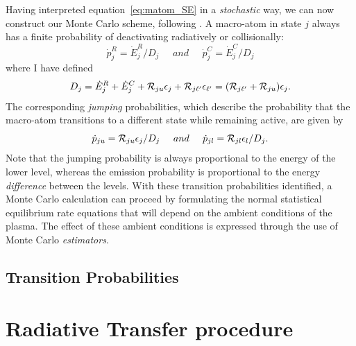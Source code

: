 Having interpreted equation~\ref{eq:matom_SE} in a {\em stochastic} way,
we can now construct our Monte Carlo scheme, following \cite{lucy2002}.
A macro-atom in state $j$ always has a finite probability of deactivating
radiatively or collisionally:
\begin{equation}
 \dot{p}_{j}^{R} = \dot{E}_{j}^{R} / D_j \;\;\;\;\; and \;\;\;
\;\; \dot{p}_{j}^{C} = \dot{E}_{j}^{C} / D_j
\end{equation}
where I have defined
\begin{equation}
D_j =  \dot{E}_{j}^{R}+\dot{E}_{j}^{C}+{\cal R}_{ju}\epsilon_{j}+
 {\cal R}_{j \ell^\prime}\epsilon_{\ell^\prime} = ({\cal R}_{j\ell^\prime} + {\cal R}_{ju}) \epsilon_{j}.
\end{equation}
The corresponding {\em jumping} probabilities, which describe the probability
that the macro-atom transitions to a different state while remaining active, 
are given by
\begin{equation}
 \dot{p}_{ju} = {\cal R}_{ju} \epsilon_{j} / D_j \;\;\;\;\; and \;\;\;
\;\; \dot{p}_{jl} = {\cal R}_{jl} \epsilon_{l} / D_j.
\end{equation}
Note that the jumping probability is always proportional to the energy
of the lower level, whereas the emission probability is proportional
to the energy {\em difference} between the levels. With these transition
probabilities identified, a Monte Carlo calculation can proceed by formulating
the normal statistical equilibrium rate equations that will depend on
the ambient conditions of the plasma. The effect of these ambient conditions
is expressed through the use of Monte Carlo {\em estimators}.

\subsection{Transition Probabilities}



\section{Radiative Transfer procedure}

